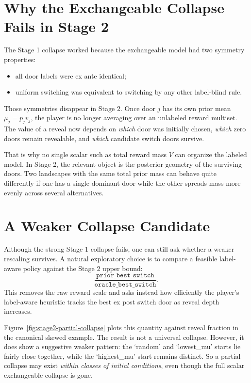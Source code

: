 \documentclass[11pt]{article}
\begin{document}
\section{Why the Exchangeable Collapse Fails in Stage 2}

The Stage 1 collapse worked because the exchangeable model had two symmetry
properties:
\begin{itemize}
\item all door labels were ex ante identical;
\item uniform switching was equivalent to switching by any other label-blind
rule.
\end{itemize}
Those symmetries disappear in Stage 2. Once door $j$ has its own prior mean
$\mu_j=p_jv_j$, the player is no longer averaging over an unlabeled reward
multiset. The value of a reveal now depends on \emph{which} door was initially
chosen, \emph{which} zero doors remain revealable, and \emph{which} candidate
switch doors survive.

That is why no single scalar such as total reward mass $V$ can organize the
labeled model. In Stage 2, the relevant object is the posterior geometry of the
surviving doors. Two landscapes with the same total prior mass can behave quite
differently if one has a single dominant door while the other spreads mass more
evenly across several alternatives.

\section{A Weaker Collapse Candidate}

Although the strong Stage 1 collapse fails, one can still ask whether a weaker
rescaling survives. A natural exploratory choice is to compare a feasible
label-aware policy against the Stage 2 upper bound:
\[
  \frac{\texttt{prior\_best\_switch}}{\texttt{oracle\_best\_switch}}.
\]
This removes the raw reward scale and asks instead how efficiently the
player's label-aware heuristic tracks the best ex post switch door as reveal
depth increases.

Figure~\ref{fig:stage2-partial-collapse} plots this quantity against reveal
fraction in the canonical skewed example. The result is not a universal
collapse. However, it does show a suggestive weaker pattern: the `random' and
`lowest\_mu' starts lie fairly close together, while the `highest\_mu' start
remains distinct. So a partial collapse may exist \emph{within classes of
initial conditions}, even though the full scalar exchangeable collapse is gone.
\end{document}
